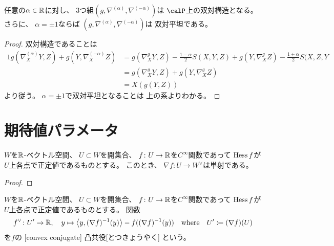 \documentclass[report]{jlreq}
\begin{document}
\begin{theorem}
    任意の$\alpha \in \mathbb{R}$に対し、
    3つ組$(g, \nabla^{(\alpha)}, \nabla^{(-\alpha)})$は
    $\calP$上の双対構造となる。
    さらに、
    $\alpha = \pm 1$ならば
    $(g, \nabla^{(\alpha)}, \nabla^{(-\alpha)})$は
    双対平坦である。
\end{theorem}

\begin{proof}
    双対構造であることは
    \begin{alignat}{1}
        g(\nabla^{(\alpha)}_X Y, Z)
            + g(Y, \nabla^{(-\alpha)}_X Z)
            &=
                g(\nabla^{g}_X Y, Z)
                - \frac{1 - \alpha}{2} S(X, Y, Z)
                + g(Y, \nabla^{g}_X Z)
                - \frac{1 + \alpha}{2} S(X, Z, Y
                \\
            &=
                g(\nabla^{g}_X Y, Z)
                + g(Y, \nabla^{g}_X Z)
                \\
            &=
                X(g(Y, Z))
    \end{alignat}
    より従う。
    $\alpha = \pm 1$で双対平坦となることは
    上の系よりわかる。
\end{proof}

%
\section{期待値パラメータ}

\begin{lemma}
    $W$を$\mathbb{R}$-ベクトル空間、
    $U \subset W$を開集合、
    $f \colon U \to \mathbb{R}$を$C^\infty$関数であって
    $\operatorname{Hess} f$が$U$上各点で正定値であるものとする。
    このとき、
    $\nabla f \colon U \to W^\vee$は単射である。
\end{lemma}

\begin{proof}
    \TODO{}
\end{proof}

\begin{definition}
    $W$を$\mathbb{R}$-ベクトル空間、
    $U \subset W$を開集合、
    $f \colon U \to \mathbb{R}$を$C^\infty$関数であって
    $\operatorname{Hess} f$が$U$上各点で正定値であるものとする。
    関数
    \begin{equation}
        f^\vee \colon U' \to \mathbb{R},
            \quad
            y
            \mapsto
            \left\langle{y},{(\nabla f)^{-1}(y)}\right\rangle - f((\nabla f)^{-1}(y))
            \quad \text{where} \quad
            U' \coloneqq (\nabla f)(U)
    \end{equation}
    を$f$の
    [convex conjugate]
        {凸共役}[とつきょうやく]
    という。
\end{definition}
\end{document}

